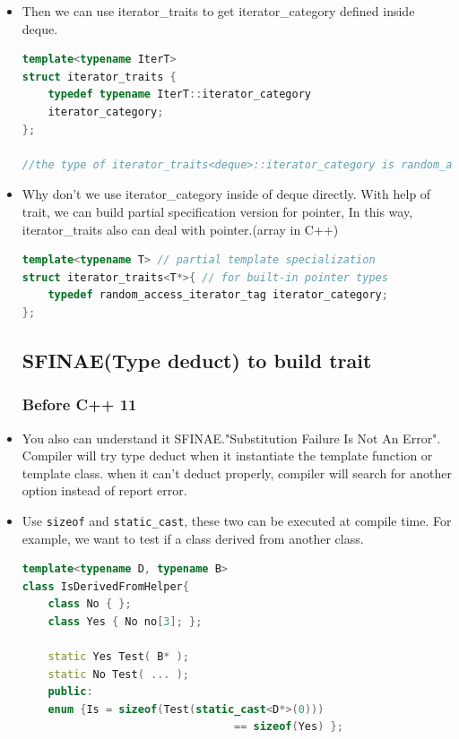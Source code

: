 \documentclass[a4paper,11pt,twoside]{book}
\begin{document}
\begin{itemize}
\item Then we can use iterator\_traits to get iterator\_category defined inside deque.
\begin{lstlisting}[frame=single, language=c++]
template<typename IterT>
struct iterator_traits {
	typedef typename IterT::iterator_category 
	iterator_category;
};

//the type of iterator_traits<deque>::iterator_category is random_access_iterator_tag
\end{lstlisting}

\item Why don't we use iterator\_category inside of deque directly. With help of trait, we can build partial specification version for pointer, In this way, iterator\_traits also can deal with pointer.(array in C++)
\begin{lstlisting}[frame=single, language=c++]
template<typename T> // partial template specialization
struct iterator_traits<T*>{ // for built-in pointer types
	typedef random_access_iterator_tag iterator_category;
};
\end{lstlisting}



\subsection{SFINAE(Type deduct) to build trait}
\subsubsection{Before C++ 11}

\item You also can understand it SFINAE."Substitution Failure Is Not An Error". Compiler will try type deduct when it instantiate the template function or template class. when it can't deduct properly, compiler will search for another option instead of report error. 
	
\item Use \texttt{sizeof} and \texttt{static\_cast}, these two can be executed at compile time. For example, we want to test if a class derived from another class.
\begin{lstlisting}[frame=single, language=c++]
template<typename D, typename B>
class IsDerivedFromHelper{
	class No { };
	class Yes { No no[3]; };
	
	static Yes Test( B* );
	static No Test( ... );
	public:
	enum {Is = sizeof(Test(static_cast<D*>(0)))
	                             == sizeof(Yes) };
	

\end{lstlisting}
\end{itemize}
\end{document}
